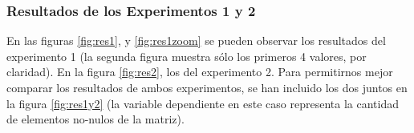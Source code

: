 \begin{figure}[ht]
\qquad
{}
\end{figure}

\begin{figure}[ht]
\end{figure}


\FloatBarrier

\subsubsection{Resultados de los Experimentos 1 y 2}
\par En las figuras \ref{fig:res1}, y \ref{fig:res1zoom} se pueden observar los resultados del experimento 1 (la segunda figura muestra s\'olo los primeros 4 valores, por claridad).
En la figura \ref{fig:res2}, los del experimento 2.
Para permitirnos mejor comparar los resultados de ambos experimentos, se han incluido los dos juntos en la figura \ref{fig:res1y2} 
(la variable dependiente en este caso representa la cantidad de elementos no-nulos de la matriz).

